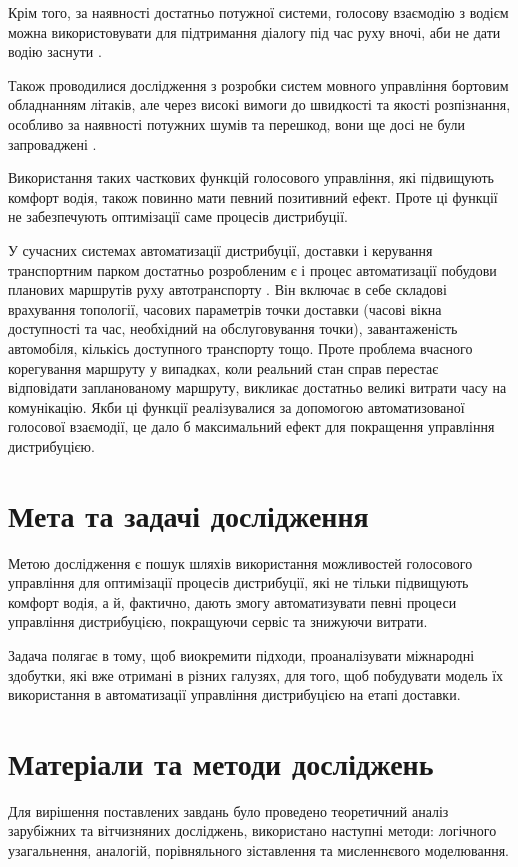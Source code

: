 Крім того, за наявності достатньо потужної системи, голосову взаємодію з водієм можна використовувати для підтримання діалогу під час руху вночі, аби не дати водію заснути \cite{Kravchenko_2012}.

Також проводилися дослідження з розробки систем мовного управління бортовим обладнанням літаків, але через високі вимоги до швидкості та якості розпізнання, особливо за наявності потужних шумів та перешкод, вони ще досі не були запроваджені \cite{Korsun_2013}.

Використання таких часткових функцій голосового управління, які підвищують комфорт водія, також повинно мати певний позитивний ефект. Проте ці функції не забезпечують оптимізації саме процесів дистрибуції.

У сучасних системах автоматизації дистрибуції, доставки і керування транспортним парком достатньо розробленим є і процес автоматизації побудови планових маршрутів руху автотранспорту \cite{art1}. Він включає в себе складові врахування топології, часових параметрів точки доставки (часові вікна доступності та час, необхідний на обслуговування точки), завантаженість автомобіля, кількісь доступного транспорту тощо. Проте проблема вчасного корегування маршруту у випадках, коли реальний стан справ перестає відповідати запланованому маршруту, викликає достатньо великі витрати часу на комунікацію. Якби ці функції реалізувалися за допомогою автоматизованої голосової взаємодії, це дало б максимальний ефект для покращення управління дистрибуцією.


\section{Мета та задачі дослідження}
Метою дослідження є пошук шляхів використання можливостей голосового управління для оптимізації процесів дистрибуції, які не тільки підвищують комфорт водія, а й, фактично, дають змогу автоматизувати певні процеси управління дистрибуцією, покращуючи сервіс та знижуючи витрати.

Задача полягає в тому, щоб виокремити підходи, проаналізувати міжнародні здобутки, які вже отримані в різних галузях, для того, щоб побудувати модель їх використання в автоматизації управління дистрибуцією на етапі доставки.


\section{Матеріали та методи досліджень}
Для вирішення поставлених завдань було проведено теоретичний аналіз зарубіжних та вітчизняних досліджень, використано наступні методи: логічного узагальнення, аналогій, порівняльного зіставлення та мисленнєвого моделювання.

